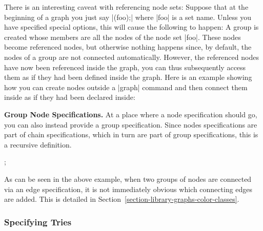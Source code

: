 There is an interesting caveat with referencing node sets: Suppose
that at the beginning of a graph you just say |(foo);| where |foo| is
a set name. Unless you have specified special options, this will cause
the following to happen: A group is created whose members are all the
nodes of the node set |foo|. These nodes become referenced nodes, but
otherwise nothing happens since, by default, the nodes of a group are
not connected automatically. However, the referenced nodes have now
been referenced inside the graph, you can thus subsequently access
them as if they had been defined inside the graph. Here is an example
showing how you can create nodes outside a |graph| command and then
connect them inside as if they had been declared inside:

\begin{codeexample}[]
\end{codeexample}


\medskip
\textbf{Group Node Specifications.}
At a place where a node specification should go, you can also instead
provide a group specification. Since nodes specifications are part of
chain specifications, which in turn are part of group specifications,
this is a recursive definition.

\begin{codeexample}[]
\tikz {};
\end{codeexample}

As can be seen in the above example, when two groups of nodes are
connected via an edge specification, it is not immediately obvious
which connecting edges are added. This is detailed in
Section~\ref{section-library-graphs-color-classes}. 



\subsubsection{Specifying Tries}

